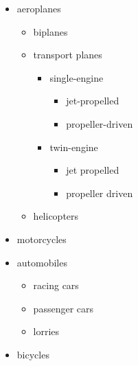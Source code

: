 \begin{Example}
\begin{ShowOutput}[\baselineskip]
        \begin{itemize}
        \item aeroplanes
          \begin{itemize}
          \item biplanes
          \item transport planes
            \begin{itemize}
            \item single-engine
              \begin{itemize}
              \item jet-propelled
              \item propeller-driven
              \end{itemize}
            \item twin-engine
              \begin{itemize}
              \item jet propelled
              \item propeller driven
              \end{itemize}
            \end{itemize}
          \item helicopters
          \end{itemize}
        \item motorcycles
        \item automobiles
          \begin{itemize}
          \item racing cars
          \item passenger cars
          \item lorries
          \end{itemize}
        \item bicycles
        \end{itemize}
      \end{ShowOutput}
    \end{Example}
  \fi
  \EndIndexGroup


